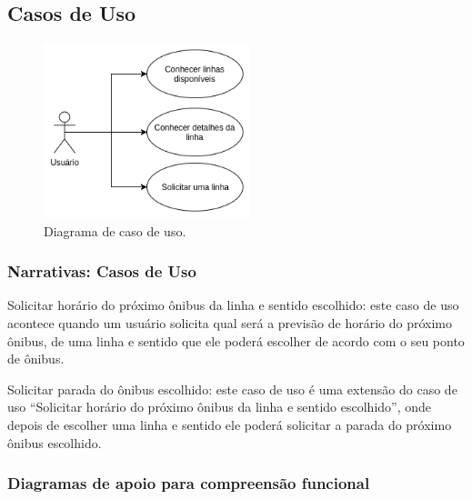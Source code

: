 \documentclass[
	12pt,				%
	oneside,			%
	a4paper,			%
	brazil				%
]{abntex2}
\begin{document}
\subsection{Casos de Uso}

\begin{figure}[H]
\centering
\includegraphics[width=6cm, center]{images/use-case-diagram.png}
\caption{Diagrama de caso de uso.}
\label{Rotulo}
\end{figure}

\subsubsection{Narrativas: Casos de Uso}

Solicitar horário do próximo ônibus da linha e sentido escolhido: este caso de uso acontece quando um usuário solicita qual será a previsão de horário do próximo ônibus, de uma linha e sentido que ele poderá escolher de acordo com o seu ponto de ônibus.

Solicitar parada do ônibus escolhido: este caso de uso é uma extensão do caso de uso “Solicitar horário do próximo ônibus da linha e sentido escolhido”, onde depois de escolher uma linha e sentido ele poderá solicitar a parada do próximo ônibus escolhido.

\newpage

\subsubsection{Diagramas de apoio para compreensão funcional}
\end{document}
